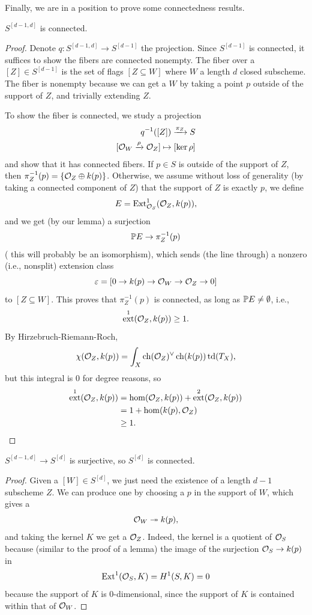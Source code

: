 \documentclass[12pt]{article}
\DeclareMathOperator{\chern}{ch}
\DeclareMathOperator{\todd}{td}
\DeclareMathOperator{\ext}{ext}
\begin{document}
Finally, we are in a position to prove some connectedness results.

\begin{prop}
    $S^{[d-1,d]}$ is connected.
\end{prop}
\begin{proof}
    Denote $q: S^{[d-1,d]} \to S^{[d-1]}$ the projection. Since $S^{[d-1]}$ is connected, it suffices to show the fibers are connected nonempty. The fiber over a $[Z]\in S^{[d-1]}$ is the set of flags $[Z\subseteq W]$ where $W$ a length $d$ closed subscheme. The fiber is nonempty because we can get a $W$ by taking a point $p$ outside of the support of $Z$, and trivially extending $Z$.

    To show the fiber is connected, we study a projection
    \begin{align*}
        q^{-1}([Z]) \xrightarrow{\pi_Z} S\\
        [\cO_W \xrightarrow{\rho} \cO_Z] \mapsto [\ker \rho]
    \end{align*}
    and show that it has connected fibers. If $p\in S$ is outside of the support of $Z$, then $\pi_Z^{-1}(p) = \{\cO_Z \oplus k(p)\}$. Otherwise, we assume without loss of generality (by taking a connected component of $Z$) that the support of $Z$ is exactly $p$, we define
    \[E = \Ext^1_{\cO_S}(\cO_Z, k(p)),\]
    and we get (by our lemma) a surjection
    \[\P E \to \pi_Z^{-1}(p)\]
    ({\color{red} this will probably be an isomorphism}), which sends (the line through) a nonzero (i.e., nonsplit) extension class
    \[\eps = [0 \to k(p) \to \cO_W \to \cO_Z \to 0]\]
    to $[Z\subseteq W]$. This proves that $\pi_Z^{-1}(p)$ is connected, as long as $\P E\neq \emptyset$, i.e.,
    \[\ext^1(\cO_Z,k(p)) \geq 1.\]
    By Hirzebruch-Riemann-Roch,
    \[\chi(\cO_Z,k(p)) = \int_X \chern(\cO_Z)^\vee \chern(k(p)) \todd(T_X),\]
    but this integral is 0 for degree reasons, so
    \begin{align*}
        \ext^1(\cO_Z,k(p)) &= \hom(\cO_Z,k(p)) + \ext^2(\cO_Z,k(p))\\
        &= 1 + \hom(k(p),\cO_Z)\\
        &\geq 1.
    \end{align*}
\end{proof}

\begin{prop}
    $S^{[d-1,d]} \to S^{[d]}$ is surjective, so $S^{[d]}$ is connected.
\end{prop}
\begin{proof}
    Given a $[W]\in S^{[d]}$, we just need the existence of a length $d-1$ subscheme $Z$. We can produce one by choosing a $p$ in the support of $W$, which gives a
    \[\cO_W \twoheadrightarrow k(p),\]
    and taking the kernel $K$ we get a $\cO_Z$. Indeed, the kernel is a quotient of $\cO_S$ because (similar to the proof of a lemma) the image of the surjection $\cO_S\to k(p)$ in
    \[\Ext^1(\cO_S,K) = H^1(S,K) = 0\]
    because the support of $K$ is 0-dimensional, since the support of $K$ is contained within that of $\cO_W$.
\end{proof}
\end{document}
